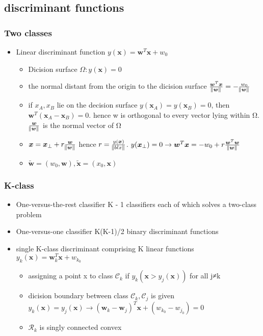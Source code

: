 \documentclass[11pt]{article}
\newcommand{\bl}[1] {\boldsymbol{#1}}
\begin{document}
\subsection{discriminant functions}
\label{sec:org60e3310}
\subsubsection{Two classes}
\label{sec:orgb6685d0}
\begin{itemize}
\item Linear discriminant function \(y(\bl{x})=\bl{w}^T\bl{x}+w_0\)
\begin{itemize}
\item Dicision surface \(\Omega:y(\bl{x})=0\)
\item the normal distant from the origin to the dicision surface
\(\frac{\bl{w}^T\bl{x}}{\norm{\bl{w}}}=-\frac{w_0}{\norm{\bl{w}}}\)
\item if \(x_A,x_B\) lie on the decision surface \(y(\bl{x}_A)=y(\bl{x}_B)=0\),
then \(\bl{w}^T(\bl{x}_A-\bl{x}_B)=0\). hence w is orthogonal to every
vector lying within Ω. \(\frac{\bl{w}}{\norm{\bl{w}}}\) is the normal
vector of Ω
\item \(\bl{x}=\bl{x}_\perp+r\frac{\bl{w}}{\norm{\bl{w}}}\) hence
\(r=\frac{y(\bl{x})}{\norm{bl{x}}}\). \(y(\bl{x}_\perp)=0\to
        \bl{w}^T\bl{x}=-w_0+r\frac{\bl{w}^T\bl{w}}{\norm{\bl{w}}}\)
\item \(\tilde{\bl{w}}=(w_0,\bl{w}), \tilde{\bl{x}}=(x_0,\bl{x})\)
\end{itemize}
\end{itemize}
\subsubsection{K-class}
\label{sec:org6b0feb4}
\begin{itemize}
\item One-versus-the-rest classifier
K - 1 classifiers each of which solves a two-class problem
\item One-versus-one classifier
K(K-1)/2 binary discriminant functions
\item single K-class discriminant comprising K linear functions
\(y_k(\bl{x})=\bl{w}_k^T\bl{x}+w_{k_0}\)
\begin{itemize}
\item assigning a point x to class \(\mathcal{C}_k\) if
\(y_k(\bl{x}>y_j(\bl{x}))\) for all j≠k
\item dicision boundary between class \(\mathcal{C}_k, \mathcal{C}_j\) is given
\(y_k(\bl{x})=y_j(\bl{x})\to
        (\bl{w}_k-\bl{w}_j)^T\bl{x}+(w_{k_0}-w_{j_0})=0\)
\item \(\mathcal{R}_k\) is singly connected convex
\end{itemize}
\end{itemize}
\end{document}
